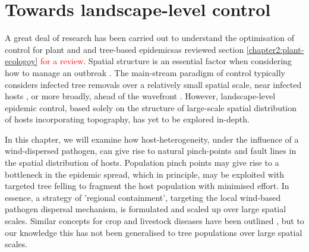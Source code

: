 
\chapter{Towards landscape-level control}


\label{ch7:landscape-level-control}

A great deal of research has been carried out to understand the optimisation of control for plant and and tree-based epidemics\textemdash as reviewed section \ref{chapter2:plant-ecologoy} \textcolor{red}{for a review}. 
Spatial structure is an essential factor when considering how to manage an outbreak \cite{spatial-control-optimisation, control-heterogeneous-landscapes}. 
The main-stream paradigm of control typically considers infected tree removals over a relatively small spatial scale, near infected hosts \cite{WEBIDEMICS}, or more broadly, ahead of the wavefront \cite{large-scale-control}. 
However, landscape-level epidemic control, based solely on the structure of large-scale spatial distribution of hosts incorporating topography, has yet to be explored in-depth.

In this chapter, we will examine how host-heterogeneity, under the influence of a wind-dispersed pathogen, can give rise to natural pinch-points and fault lines in the spatial distribution of hosts. 
Population pinch points may give rise to a bottleneck in the epidemic spread, which in principle, 
may be exploited with targeted tree felling to fragment the host population with minimised effort. 
In essence, a strategy of 'regional containment', targeting the local wind-based pathogen dispersal mechanism, is formulated and scaled up over large spatial scales. Similar concepts for crop and livestock diseases have been outlined \cite{PAPAIX201435, GILIOLI20131, Gilligan-disease-management}, but to our knowledge this has not been generalised to tree populations over large spatial scales.

